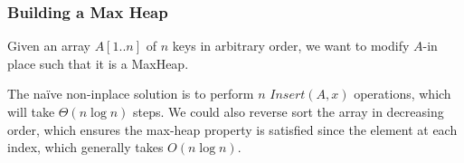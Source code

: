 \subsubsection{Building a Max Heap}

\begin{problem}
Given an array $A[1..n]$ of $n$ keys in arbitrary order, we want to modify $A$-in place such that it is a MaxHeap.
\end{problem}

The na\"{i}ve non-inplace solution is to perform $n$ $Insert(A, x)$ operations, which will take $\Theta(n \log n)$ steps. We could also reverse sort the array in decreasing order, which ensures the max-heap property is satisfied since the element at each index, which generally takes $O(n \log n)$.
